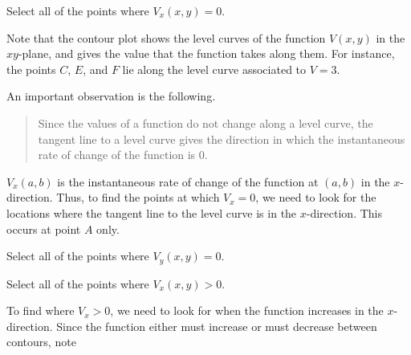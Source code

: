 \documentclass{ximera}
\begin{document}
\begin{exercise}
Select all of the points where $V_x(x,y)=0$.

\begin{selectAll}
\end{selectAll}

\begin{hint}
Note that the contour plot shows the level curves of the function $V(x,y)$ in the $xy$-plane, and gives the value that the function takes along them.  For instance, the points $C$, $E$, and $F$ lie along the level curve associated to $V=3$.

An important observation is the following.

\begin{quote}
Since the values of a function do not change along a level curve, the tangent line to a level curve gives the direction in which the instantaneous rate of change of the function is $0$.
\end{quote}

$V_x(a,b)$ is the instantaneous rate of change of the function at $(a,b)$ in the $x$-direction.  Thus, to find the points at which $V_x=0$, we need to look for the locations where the tangent line to the level curve is in the $x$-direction.  This occurs at point $A$ only.

\end{hint}

\begin{exercise}
Select all of the points where $V_y(x,y)=0$.

\begin{selectAll}
\end{selectAll}

\end{exercise}  
\begin{exercise}
Select all of the points where $V_x(x,y)>0$.

\begin{selectAll}
\end{selectAll}

\begin{hint}
To find where $V_x>0$, we need to look for when the function increases in the $x$-direction.  Since the function either must increase or must decrease between contours, note


\end{hint}
\end{exercise}
\end{exercise}
\end{document}
